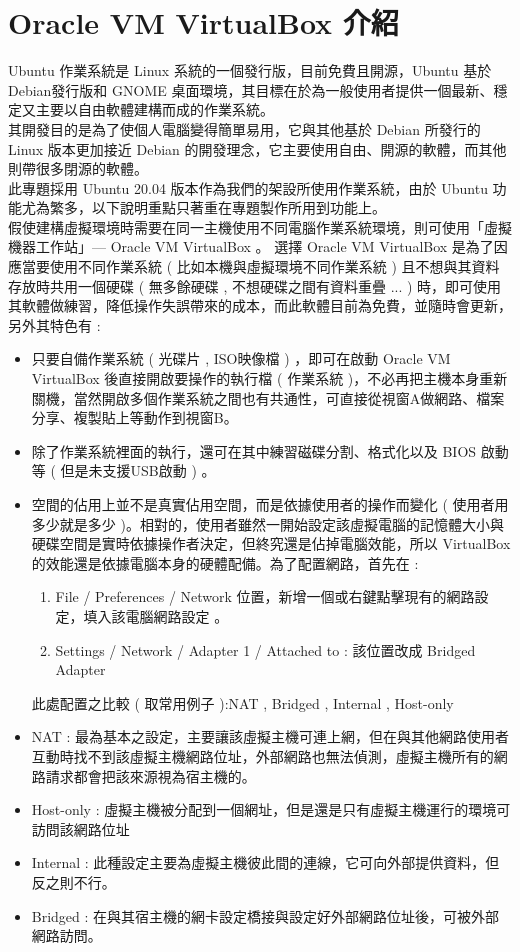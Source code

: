 \documentclass[14pt,a4paper]{report}  %
\begin{document}
\section{Oracle VM VirtualBox 介紹}
\qquad Ubuntu 作業系統是 Linux 系統的一個發行版，目前免費且開源，Ubuntu 基於 Debian發行版和 GNOME 桌面環境，其目標在於為一般使用者提供一個最新、穩定又主要以自由軟體建構而成的作業系統。\\
\qquad 其開發目的是為了使個人電腦變得簡單易用，它與其他基於 Debian 所發行的 Linux 版本更加接近 Debian 的開發理念，它主要使用自由、開源的軟體，而其他則帶很多閉源的軟體。\\
\qquad 此專題採用 Ubuntu 20.04 版本作為我們的架設所使用作業系統，由於 Ubuntu 功能尤為繁多，以下說明重點只著重在專題製作所用到功能上。\\
假使建構虛擬環境時需要在同一主機使用不同電腦作業系統環境，則可使用「虛擬機器工作站」— Oracle VM VirtualBox 。
\qquad 選擇 Oracle VM VirtualBox    是為了因應當要使用不同作業系統 ( 比如本機與虛擬環境不同作業系統  ) 且不想與其資料存放時共用一個硬碟 ( 無多餘硬碟 , 不想硬碟之間有資料重疊 ... ) 時，即可使用其軟體做練習，降低操作失誤帶來的成本，而此軟體目前為免費，並隨時會更新，另外其特色有 :\\  
\begin{itemize}


\item 只要自備作業系統 ( 光碟片 , ISO映像檔 ) ，即可在啟動 Oracle VM VirtualBox  後直接開啟要操作的執行檔 ( 作業系統 )，不必再把主機本身重新關機，當然開啟多個作業系統之間也有共通性，可直接從視窗A做網路、檔案分享、複製貼上等動作到視窗B。\\
\item 除了作業系統裡面的執行，還可在其中練習磁碟分割、格式化以及 BIOS 啟動等 ( 但是未支援USB啟動 ) 。\\
\item 空間的佔用上並不是真實佔用空間，而是依據使用者的操作而變化 ( 使用者用多少就是多少 )。相對的，使用者雖然一開始設定該虛擬電腦的記憶體大小與硬碟空間是實時依據操作者決定，但終究還是佔掉電腦效能，所以 VirtualBox 的效能還是依據電腦本身的硬體配備。為了配置網路，首先在 : \\
\begin{enumerate}
\item File / Preferences / Network  位置，新增一個或右鍵點擊現有的網路設定，填入該電腦網路設定 。
\item Settings / Network / Adapter 1 / Attached to :  該位置改成  Bridged Adapter
\end{enumerate}
\qquad 此處配置之比較 ( 取常用例子 ):NAT , Bridged , Internal , Host-only
\item NAT : 最為基本之設定，主要讓該虛擬主機可連上網，但在與其他網路使用者互動時找不到該虛擬主機網路位址，外部網路也無法偵測，虛擬主機所有的網路請求都會把該來源視為宿主機的。
\item Host-only : 虛擬主機被分配到一個網址，但是還是只有虛擬主機運行的環境可訪問該網路位址
\item Internal : 此種設定主要為虛擬主機彼此間的連線，它可向外部提供資料，但反之則不行。
\item Bridged : 在與其宿主機的網卡設定橋接與設定好外部網路位址後，可被外部網路訪問。
\end{itemize}
\end{document}

